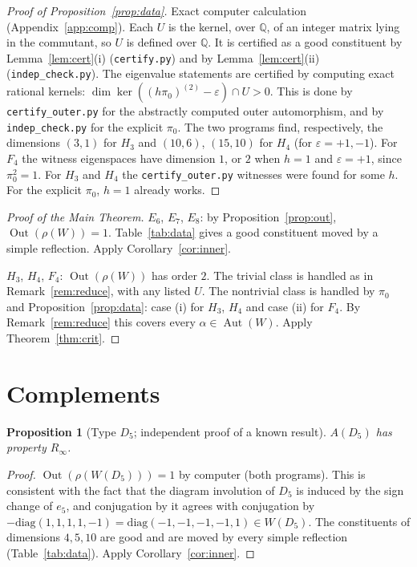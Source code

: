 \documentclass[11pt]{amsart}
\newtheorem{proposition}[theorem]{Proposition}
\theoremstyle{definition}
\newcommand{\Q}{\mathbb{Q}}
\newcommand{\Aut}{\operatorname{Aut}}
\newcommand{\Out}{\operatorname{Out}}
\newcommand{\Rinf}{R_\infty}
\begin{document}
\begin{proof}[Proof of Proposition~\ref{prop:data}]
Exact computer calculation (Appendix~\ref{app:comp}). Each $U$ is the kernel, over $\Q$, of an integer matrix
lying in the commutant, so $U$ is defined over $\Q$. It is certified as a good constituent by
Lemma~\ref{lem:cert}(i) (\texttt{certify.py}) and by Lemma~\ref{lem:cert}(ii) (\texttt{indep\_check.py}). The
eigenvalue statements are certified by computing exact rational kernels: $\dim\ker((h\pi_0)^{(2)}-\varepsilon)\cap
U>0$. This is done by \texttt{certify\_outer.py} for the abstractly computed outer automorphism, and by
\texttt{indep\_check.py} for the explicit $\pi_0$. The two programs find, respectively, the dimensions
$(3,1)$ for $H_3$ and $(10,6)$, $(15,10)$ for $H_4$ (for $\varepsilon=+1,-1$). For $F_4$ the witness eigenspaces
have dimension $1$, or $2$ when $h=1$ and $\varepsilon=+1$, since $\pi_0^2=1$. For $H_3$ and $H_4$ the
\texttt{certify\_outer.py} witnesses were found for some $h$. For the explicit $\pi_0$, $h=1$ already works.
\end{proof}

\begin{proof}[Proof of the Main Theorem]
$E_6$, $E_7$, $E_8$: by Proposition~\ref{prop:out}, $\Out(\rho(W))=1$. Table~\ref{tab:data} gives a good
constituent moved by a simple reflection. Apply Corollary~\ref{cor:inner}.

$H_3$, $H_4$, $F_4$: $\Out(\rho(W))$ has order $2$. The trivial class is handled as in
Remark~\ref{rem:reduce}, with any listed $U$. The nontrivial class is handled by $\pi_0$ and
Proposition~\ref{prop:data}: case (i) for $H_3$, $H_4$ and case (ii) for $F_4$. By Remark~\ref{rem:reduce} this
covers every $\alpha\in\Aut(W)$. Apply Theorem~\ref{thm:crit}.
\end{proof}

\section{Complements}\label{sec:complements}

\begin{proposition}[Type $D_5$; independent proof of a known result]\label{prop:D5}
$A(D_5)$ has property $\Rinf$.
\end{proposition}
\begin{proof}
$\Out(\rho(W(D_5)))=1$ by computer (both programs). This is consistent with the fact that the diagram involution
of $D_5$ is induced by the sign change of $e_5$, and conjugation by it agrees with conjugation by $-\mathrm{diag}(1,1,1,1,-1)=\mathrm{diag}(-1,-1,-1,-1,1)\in W(D_5)$. The constituents of dimensions $4,5,10$ are
good and are moved by every simple reflection (Table~\ref{tab:data}). Apply Corollary~\ref{cor:inner}.
\end{proof}
\end{document}
